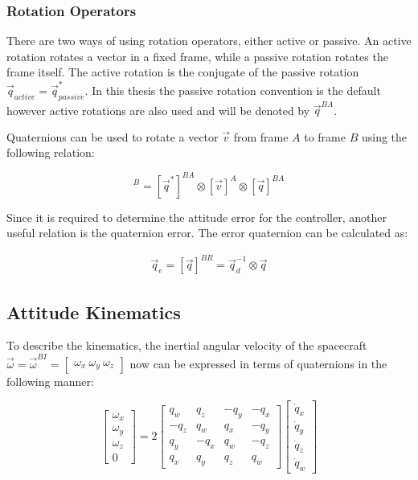 \subsubsection{Rotation Operators}
There are two ways of using rotation operators, either active or passive. An active rotation rotates a vector in a fixed frame, while a passive rotation rotates the frame itself. The active rotation is the conjugate of the passive rotation $\vec{q}_{active} = \vec{q}^{*}_{passive}$. In this thesis the passive rotation convention is the default however active rotations are also used and will be denoted by $\vec{q}^{BA}$.

Quaternions can be used to rotate a vector $\vec{v}$ from frame $A$ to frame $B$ using the following relation:

\begin{equation}
    [\vec{v}]^{B} = [\vec{q}^*]^{BA} \otimes [\vec{v}]^{A} \otimes [\vec{q}]^{BA}
\end{equation}

Since it is required to determine the attitude error for the controller, another useful relation is the quaternion error. The error quaternion can be calculated as:

\begin{align}
    \vec{q}_e = [\vec{q}]^{BR} =  \vec{q}_d^{-1} \otimes \vec{q}
\end{align}

\subsection{Attitude Kinematics}
\label{subsec:attitude_error}
To describe the kinematics, the inertial angular velocity of the spacecraft $\vec{\omega} = \vec{\omega}^{BI} = \begin{bmatrix}\omega_x \ \omega_y \ \omega_z \end{bmatrix}$ now can be expressed in terms of quaternions in the following manner:


$$\begin{bmatrix} \omega_x \\ \omega_y \\ \omega_z \\ 0 \end{bmatrix} = 2 
\begin{bmatrix} q_{w} & q_{z} & -q_{y} & -q_{x} 
            \\ -q_{z} & q_{w} & q_{x} & -q_{y} 
            \\ q_{y} & -q_{x} & q_{w} & -q_{z}
            \\  q_{x} & q_{y} & q_{z} & q_{w}
\end{bmatrix} 
\begin{bmatrix} \dot{q}_{x} \\ \dot{q}_{y} \\ \dot{q}_{z} \\ \dot{q}_{w} \end{bmatrix}$$

